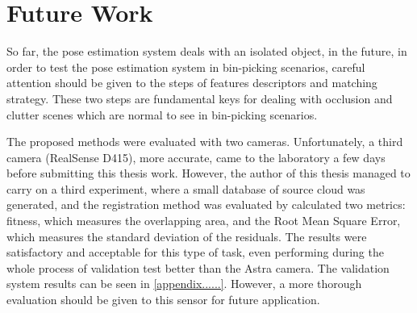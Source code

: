 \chapter{Future Work}
\label{chap:futurework}


So far, the pose estimation system deals with an isolated object, in the future, in order to test the pose estimation system in bin-picking scenarios, careful attention should be given to the steps of features descriptors and matching strategy. These two steps are fundamental keys for dealing with occlusion and clutter scenes which are normal to see in bin-picking scenarios.

The proposed methods were evaluated with two cameras. Unfortunately, a third camera (RealSense D415), more accurate, came to the laboratory a few days before submitting this thesis work. However, the author of this thesis managed to carry on a third experiment, where a small database of source cloud was generated, and the registration method was evaluated by calculated two metrics: fitness, which measures the overlapping area, and the Root Mean Square Error, which measures the standard deviation of the residuals. The results were satisfactory and acceptable for this type of task, even performing during the whole process of validation test better than the Astra camera. The validation system results can be seen in \ref{appendix......}. However, a more thorough evaluation should be given to this sensor for future application.  

